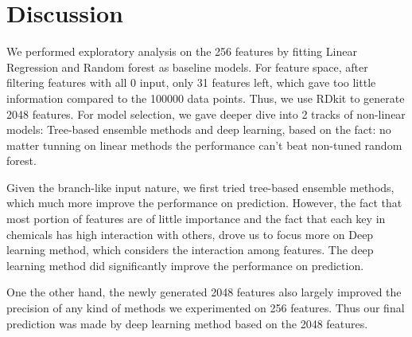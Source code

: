 \documentclass[11pt]{article}
\begin{document}
\section{Discussion} 
We performed exploratory analysis on the 256 features by fitting Linear Regression and Random forest as baseline models. For feature space, after filtering features with all 0 input, only 31 features left, which gave too little information compared to the 100000 data points. Thus, we use RDkit to generate 2048 features.  For model selection, we gave deeper dive into 2 tracks of non-linear models: Tree-based ensemble methods and deep learning, based on the fact: no matter tunning on linear methods the performance can't beat non-tuned random forest.

Given the branch-like input nature, we first tried tree-based ensemble methods, which much more improve the performance on prediction. However, the fact that most portion of features are of little importance and the fact that each key in chemicals has high interaction with others, drove us to focus more on Deep learning method, which considers the interaction among features. The deep learning method did significantly improve the performance on prediction.

One the other hand, the newly generated 2048 features also largely improved the precision of any kind of methods we experimented on 256 features. Thus our final prediction was made by deep learning method based on the 2048 features.
\end{document}

